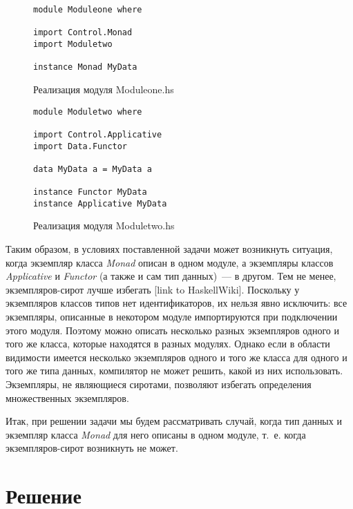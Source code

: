 \begin{figure}[h]
\begin{lstlisting}
module Moduleone where

import Control.Monad
import Moduletwo

instance Monad MyData
\end{lstlisting}
\caption{Реализация модуля Moduleone.hs}\label{one2}
\end{figure}

\begin{figure}[h]
\begin{lstlisting}
module Moduletwo where

import Control.Applicative
import Data.Functor

data MyData a = MyData a

instance Functor MyData
instance Applicative MyData
\end{lstlisting}
\caption{Реализация модуля Moduletwo.hs}\label{two2}
\end{figure}

Таким образом, в условиях поставленной задачи может возникнуть ситуация, когда экземпляр класса \textit{Monad} описан в одном модуле, а экземпляры классов \textit{Applicative} и \textit{Functor} (а также и сам тип данных)~--- в другом. Тем не менее, экземпляров-сирот лучше избегать [link to HaskellWiki]. Поскольку у экземпляров классов типов нет идентификаторов, их нельзя явно исключить: все экземпляры, описанные в некотором модуле импортируются при подключении этого модуля. Поэтому можно описать несколько разных экземпляров одного и того же класса, которые находятся в разных модулях. Однако если в области видимости имеется несколько экземпляров одного и того же класса для одного и того же типа данных, компилятор не может решить, какой из них использовать. Экземпляры, не являющиеся сиротами, позволяют избегать определения множественных экземпляров.

Итак, при решении задачи мы будем рассматривать случай, когда тип данных и экземпляр класса \textit{Monad} для него описаны в одном модуле, т.~е. когда экземпляров-сирот возникнуть не может.

\newpage
\section{Решение}
